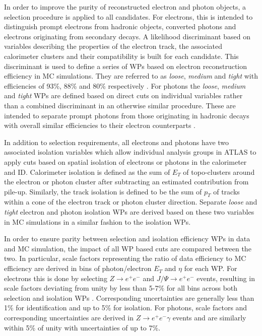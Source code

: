In order to improve the purity of reconstructed electron and photon objects, a selection procedure is applied to all 
candidates. For electrons, this is intended to distinguish prompt electrons from hadronic objects, converted photons 
and electrons originating from secondary decays. A likelihood discriminant based on variables describing the properties 
of the electron track, the associated calorimeter clusters and their compatibility is built for each candidate. This 
discriminant is used to define a series of WPs based on electron reconstruction efficiency in MC simulations. They are 
referred to as \textit{loose}, \textit{medium} and \textit{tight} with efficiencies of 93\%, 88\% and 80\% respectively 
\cite{atlas-electrons-photons}. For photons the \textit{loose}, \textit{medium} and \textit{tight} WPs are defined 
based on direct cuts on individual variables rather than a combined discriminant in an otherwise similar procedure. 
These are intended to separate prompt photons from those originating in hadronic decays with overall similar 
efficiencies to their electron counterparts \cite{atlas-photons}. \par

In addition to selection requirements, all electrons and photons have two associated isolation variables which allow 
individual analysis groups in ATLAS to apply cuts based on spatial isolation of electrons or photons in the calorimeter 
and ID. Calorimeter isolation is defined as the sum of $E_T$ of topo-clusters around the electron or photon cluster 
after subtracting an estimated contribution from pile-up. Similarly, the track isolation is defined to be the sum of 
$p_T$ of tracks within a cone of the electron track or photon cluster direction. Separate \textit{loose} and 
\textit{tight} electron and photon isolation WPs are derived based on these two variables in MC simulations in a similar 
fashion to the isolation WPs. \par

In order to ensure parity between selection and isolation efficiency WPs in data and MC simulation, the impact of all WP 
based cuts are compared between the two. In particular, scale factors representing the ratio of data efficiency to MC 
efficiency are derived in bins of photon/electron $E_T$ and $\eta$ for each WP. For electrons this is done by selecting 
$Z \rightarrow e^+e^-$ and $J/\Psi \rightarrow e^+e^-$ events, resulting in scale factors deviating from unity by less 
than 5-7\% for all bins across both selection and isolation WPs \cite{atlas-electrons}. Corresponding uncertainties are 
generally less than 1\% for identification and up to 5\% for isolation. For photons, scale factors and corresponding 
uncertainties are derived in $Z \rightarrow e^+e^-\gamma$ events and are similarly within 5\% of unity with uncertainties 
of up to 7\%. \par


